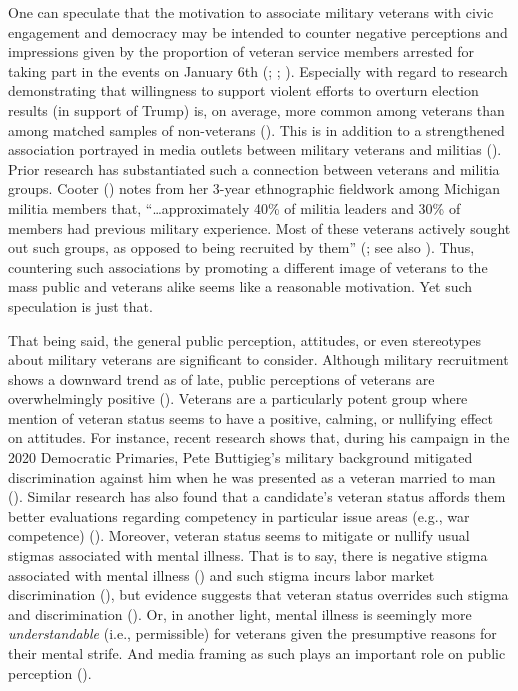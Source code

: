 \documentclass[
  12pt,
  letterpaper,
]{article}
\begin{document}
One can speculate that the motivation to associate military veterans
with civic engagement and democracy may be intended to counter negative
perceptions and impressions given by the proportion of veteran service
members arrested for taking part in the events on January 6th
(;
;
). Especially with
regard to research demonstrating that willingness to support violent
efforts to overturn election results (in support of Trump) is, on
average, more common among veterans than among matched samples of
non-veterans (). This is in
addition to a strengthened association portrayed in media outlets
between military veterans and militias
(). Prior research has
substantiated such a connection between veterans and militia groups.
Cooter () notes from her 3-year
ethnographic fieldwork among Michigan militia members that,
``\ldots approximately 40\% of militia leaders and 30\% of members had
previous military experience. Most of these veterans actively sought out
such groups, as opposed to being recruited by them''
(; see also
). Thus, countering such
associations by promoting a different image of veterans to the mass
public and veterans alike seems like a reasonable motivation. Yet such
speculation is just that.

That being said, the general public perception, attitudes, or even
stereotypes about military veterans are significant to consider.
Although military recruitment shows a downward trend as of late, public
perceptions of veterans are overwhelmingly positive
().
Veterans are a particularly potent group where mention of veteran status
seems to have a positive, calming, or nullifying effect on attitudes.
For instance, recent research shows that, during his campaign in the
2020 Democratic Primaries, Pete Buttigieg's military background
mitigated discrimination against him when he was presented as a veteran
married to man ().
Similar research has also found that a candidate's veteran status
affords them better evaluations regarding competency in particular issue
areas (e.g., war competence) (). Moreover, veteran status seems to mitigate or nullify usual
stigmas associated with mental illness. That is to say, there is
negative stigma associated with mental illness
() and such stigma
incurs labor market discrimination (), but evidence suggests that veteran status overrides such
stigma and discrimination (). Or, in another light, mental illness is seemingly more
\emph{understandable} (i.e., permissible) for veterans given the
presumptive reasons for their mental strife. And media framing as such
plays an important role on public perception
().
\end{document}
